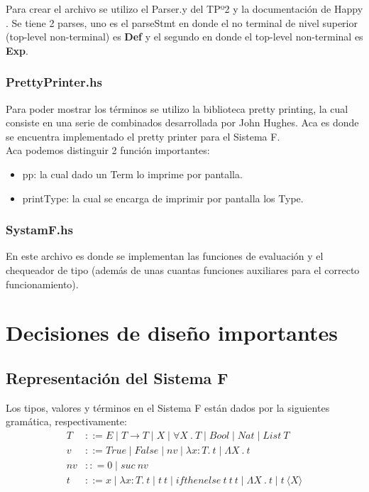 \documentclass[12pt, titlepage, a4paper]{article}
\begin{document}
Para crear el archivo se utilizo el Parser.y del TPº2 \cite{tp2:lambdaCalculoSimpleTipado} y la documentación de Happy \cite{haskellHappy}.
Se tiene 2 parses, uno es el parseStmt en donde el no terminal de nivel superior (top-level non-terminal) es \textbf{Def} y el 
segundo en donde el top-level non-terminal es \textbf{Exp}. \\

\subsubsection{PrettyPrinter.hs}
Para poder mostrar los términos se utilizo la biblioteca pretty printing, la cual consiste en una serie de combinados desarrollada por John Hughes. Aca es 
donde se encuentra implementado el pretty printer para el Sistema F. \\
Aca podemos distinguir 2 función importantes:
\begin{itemize}[label=$\bullet$]
  \item {pp: la cual dado un Term lo imprime por pantalla.}
  \item {printType: la cual se encarga de imprimir por pantalla los Type.}
\end{itemize}

\subsubsection{SystamF.hs}
En este archivo es donde se implementan las funciones de evaluación y el chequeador de tipo (además de unas cuantas funciones auxiliares 
para el correcto funcionamiento).

\section{Decisiones de diseño importantes}
\subsection{Representación del Sistema F}
Los tipos, valores y términos en el Sistema F están dados por la siguientes gramática, respectivamente:
\begin{align*}
    T &::= E \mid T \rightarrow T \mid X \mid \forall X \ . \ T \mid Bool \mid Nat \mid List \ T\\
    v &::= True \mid False \mid nv \mid \lambda x:T. \ t \mid \Lambda X \ . \ t \\
    nv &:: = 0 \mid suc \ nv \\
    t &::= x \mid \lambda x:T. \ t \mid t \ t \mid ifthenelse \ t \ t \ t \mid \Lambda X \ . \ t \mid t \ \langle X \rangle \\
\end{align*}
\end{document}
